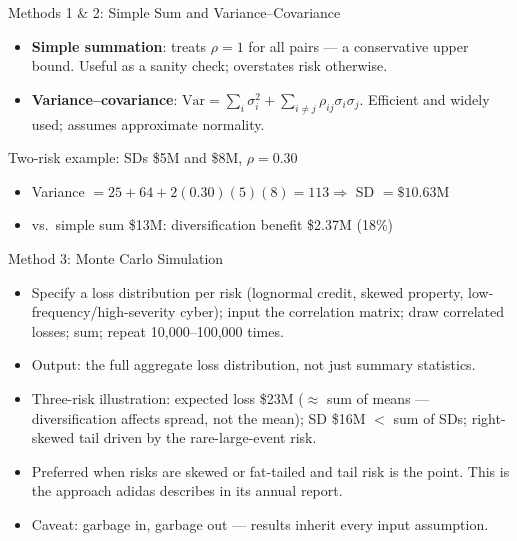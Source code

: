 \documentclass[11pt, aspectratio=169]{beamer}
\begin{document}
\begin{frame}{Methods 1 \& 2: Simple Sum and Variance--Covariance}
\begin{itemize}
  \item \textbf{Simple summation}: treats $\rho = 1$ for all pairs --- a conservative \alert{upper bound}. Useful as a sanity check; overstates risk otherwise.
  \item \textbf{Variance--covariance}: $\text{Var} = \sum_i \sigma_i^2 + \sum_{i \neq j} \rho_{ij}\sigma_i\sigma_j$. Efficient and widely used; assumes approximate normality.
\end{itemize}
\begin{exampleblock}{Two-risk example: SDs \$5M and \$8M, $\rho = 0.30$}
\begin{itemize}
  \item Variance $= 25 + 64 + 2(0.30)(5)(8) = 113 \Rightarrow$ SD $= \$10.63$M
  \item vs.\ simple sum \$13M: diversification benefit \$2.37M (18\%)
\end{itemize}
\end{exampleblock}
\end{frame}

\begin{frame}{Method 3: Monte Carlo Simulation}
\begin{itemize}
  \item Specify a loss distribution per risk (lognormal credit, skewed property, low-frequency/high-severity cyber); input the correlation matrix; draw correlated losses; sum; repeat 10{,}000--100{,}000 times.
  \item Output: the full \alert{aggregate loss distribution}, not just summary statistics.
  \item Three-risk illustration: expected loss \$23M ($\approx$ sum of means --- diversification affects spread, not the mean); SD \$16M $<$ sum of SDs; right-skewed tail driven by the rare-large-event risk.
  \item Preferred when risks are skewed or fat-tailed and tail risk is the point. This is the approach adidas describes in its annual report.
  \item Caveat: garbage in, garbage out --- results inherit every input assumption.
\end{itemize}
\end{frame}
\end{document}
